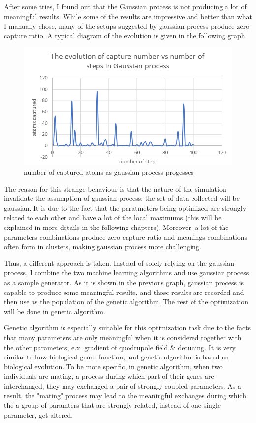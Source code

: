 \documentclass{article}
\begin{document}
After some tries, I found out that the Gaussian process is not producing a lot of meaningful results. While some of the results are impressive and better than what I manually chose, many of the setups suggested by gaussian process produce zero capture ratio. A typical diagram of the evolution is given in the following graph.
\begin{figure}
	\includegraphics[width=\columnwidth]{GP.png}
	\caption{number of captured atoms as gaussian process progesses}
\end{figure}

The reason for this strange behaviour is that the nature of the simulation invalidate the assumption of gaussian process: the set of data collected will be gaussian. It is due to the fact that the paratmeters being optimized are strongly related to each other and have a lot of the local maximums (this will be explained in more details in the following chapters). Moreover, a lot of the parameters combinations produce zero capture ratio and meanings combinations often form in clusters, making gaussian process more challenging.

Thus, a different approach is taken. Instead of solely relying on the gaussian process, I combine the two machine learning algorithms and use gaussian process as a sample generator. As it is shown in the previous graph, gaussian process is capable to produce some meaningful results, and those results are recorded and then use as the population of the genetic algorithm. The rest of the optimization will be done in genetic algorithm.

Genetic algorithm is especially suitable for this optimization task due to the facts that many parameters are only meaningful when it is considered together with the other parameters, e.x. gradient of quodrupole field & detuning. It is very similar to how biological genes function, and  genetic algorithm is based on biological evolution. To be more specific, in genetic algorithm, when two individuals are mating, a process during which part of their genes are interchanged, they may exchanged a pair of strongly coupled parameters. As a result, the "mating" process may lead to the meaningful exchanges during which the a group of paramters that are strongly related, instead of one single parameter, get altered.
\end{document}
